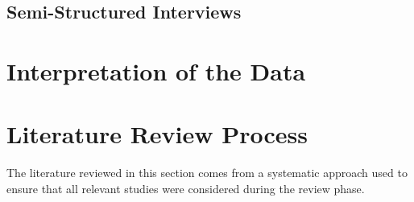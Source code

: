 \subsection{Semi-Structured Interviews} \label{semi-structured_interviews}

\section{Interpretation of the Data} \label{data_interpretation}








\section{Literature Review Process} \label{literature_review_process}
The literature reviewed in this section comes from a systematic approach used to ensure that all relevant studies were considered during the review phase.

